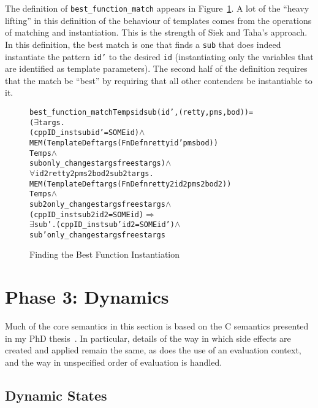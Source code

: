 \documentclass[11pt]{article}
\begin{document}
The definition of \texttt{best_function_match} appears in
Figure~\ref{fig:best-function-match}.  A lot of the ``heavy lifting''
in this definition of the behaviour of templates comes from the
operations of matching and instantiation.  This is the strength of
Siek and Taha's approach.  In this definition, the best match is one
that finds a \texttt{sub} that does indeed instantiate the pattern
\texttt{id'} to the desired \texttt{id} (instantiating only the
variables that are identified as template parameters).  The second
half of the definition requires that the match be ``best'' by
requiring that all other contenders be instantiable to it.
\begin{figure}[htbp]
\begin{alltt}
   best_function_match Temps id sub (id', (retty,pms,bod)) =
     (\(\exists\)targs.
         (cppID_inst sub id' = SOME id) \(\land\)
         MEM (TemplateDef targs (FnDefn retty id' pms bod))
             Temps \(\land\)
         sub only_changes targsfrees targs) \(\land\)
     \(\forall\)id2 retty2 pms2 bod2 sub2 targs.
         MEM (TemplateDef targs (FnDefn retty2 id2 pms2 bod2))
             Temps \(\land\)
         sub2 only_changes targsfrees targs \(\land\)
         (cppID_inst sub2 id2 = SOME id) \(\Rightarrow\)
         \(\exists\)sub'. (cppID_inst sub' id2 = SOME id') \(\land\)
                sub' only_changes targsfrees targs
\end{alltt}
\caption{Finding the Best Function Instantiation}
\label{fig:best-function-match}
\end{figure}


\section{Phase 3: Dynamics}
\label{sec:phase3}

 Much of the core semantics in this section
is based on the C semantics presented in my PhD
thesis~\cite{Norrish98}.  In particular, details of the way in which
side effects are created and applied remain the same,%
%
as does the use of an evaluation context, and the way in unspecified
order of evaluation is handled.

\subsection{Dynamic States}
\label{sec:dynamic-states}
\end{document}

